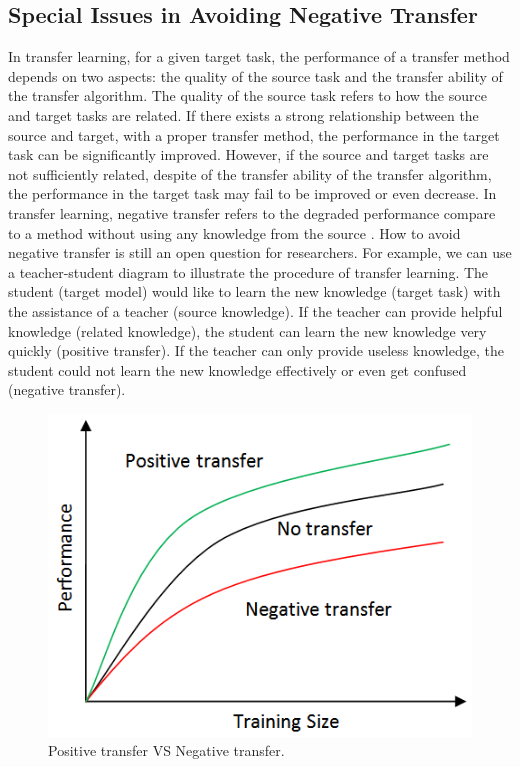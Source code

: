 \subsection{Special Issues in Avoiding Negative Transfer}
In transfer learning, for a given target task, the performance of a transfer method depends on two aspects: the quality of the source task and the transfer ability of the transfer algorithm. The quality of the source task refers to how the source and target tasks are related. If there exists a strong relationship between the source and target, with a proper transfer method, the performance in the target task can be significantly improved. However, if the source and target tasks are not sufficiently related, despite of the transfer ability of the transfer algorithm, the performance in the target task may fail to be improved or even decrease. In transfer learning, negative transfer refers to the degraded performance compare to a method without using any knowledge from the source \cite{pan2010survey}. How to avoid negative transfer is still an open question for researchers. 
For example, we can use a teacher-student diagram to illustrate the procedure of transfer learning. The student (target model) would like to learn the new knowledge (target task) with the assistance of a teacher (source knowledge). If the teacher can provide helpful knowledge (related knowledge), the student can learn the new knowledge very quickly (positive transfer). If the teacher can only provide useless knowledge, the student could not learn the new knowledge effectively or even get confused (negative transfer).

\begin{figure}
	\centering
	\includegraphics[scale=.7]{relatedwork/fig/negative.png}
	\caption{Positive transfer VS Negative transfer.}
\end{figure}


